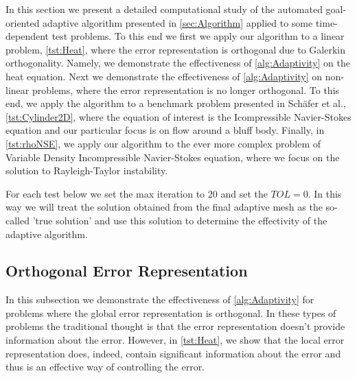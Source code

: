 In this section we present a detailed computational study of the automated
goal-oriented adaptive algorithm presented in \autoref{sec:Algorithm} applied to
some time-dependent test problems. To this end we first we apply our algorithm
to a linear problem, \autoref{tst:Heat}, where the error representation is
orthogonal due to Galerkin orthogonality. Namely, we demonstrate the
effectiveness of \autoref{alg:Adaptivity} on the heat equation. Next we
demonstrate the effectiveness of \autoref{alg:Adaptivity} on non-linear
problems, where the error representation is no longer orthogonal. To this end,
we apply the algorithm to a benchmark problem presented in Sch\"afer et
al.\cite{Schaefer1996}, \autoref{tst:Cylinder2D}, where the equation of interest
is the Icompressible Navier-Stokes equation and our particular focus is on flow
around a bluff body.  Finally, in \autoref{tst:rhoNSE}, we apply our algorithm
to the ever more complex problem of Variable Density Incompressible
Navier-Stokes equation, where we focus on the solution to Rayleigh-Taylor
instability.

For each test below we set the max iteration to $20$ and set the $TOL=0$. In
this way we will treat the solution obtained from the final adaptive mesh as the
so-called 'true solution' and use this solution to determine the effectivity of
the adaptive algorithm.

\subsection{Orthogonal Error Representation}
In this subsection we demonstrate the effectiveness of \autoref{alg:Adaptivity}
for problems where the global error representation is orthogonal. In these types
of problems the traditional thought is that the error representation doesn't
provide information about the error. However, in \autoref{tst:Heat}, we show
that the local error representation does, indeed, contain significant
information about the error and thus is an effective way of controlling the
error.

